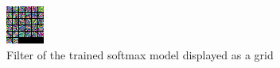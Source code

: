 \begin{figure}[h!]
  \begin{center}
    \includegraphics[width=.5\linewidth]{../code/assignment/2_pytorch/convnet_gridfilt.png}
    \caption{Filter of the trained softmax model displayed as a grid}
  \end{center}
\end{figure}

